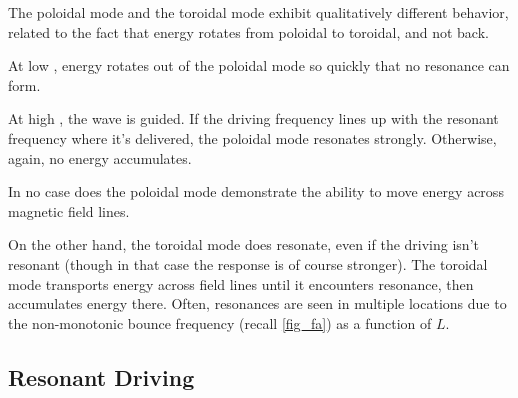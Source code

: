 The poloidal mode and the toroidal mode exhibit qualitatively different behavior, related to the fact that energy rotates from poloidal to toroidal, and not back. 

At low \azm, energy rotates out of the poloidal mode so quickly that no resonance can form. 

At high \azm, the \Alfven wave is guided. If the driving frequency lines up with the resonant frequency where it's delivered, the poloidal mode resonates strongly. Otherwise, again, no energy accumulates. 

In no case does the poloidal mode demonstrate the ability to move energy across magnetic field lines. 

On the other hand, the toroidal mode does resonate, even if the driving isn't resonant (though in that case the response is of course stronger). The toroidal mode transports energy across field lines until it encounters resonance, then accumulates energy there. Often, resonances are seen in multiple locations due to the non-monotonic \Alfven bounce frequency (recall \cref{fig_fa}) as a function of $L$. 





\subsection{Resonant Driving}


